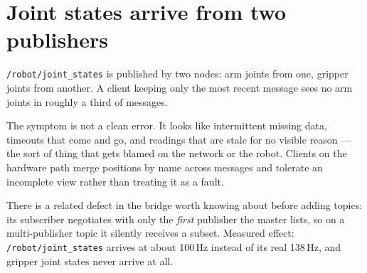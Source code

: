 \section{Joint states arrive from two publishers}
\label{sec:jointstate-merge}

\texttt{/robot/joint\_states} is published by two nodes: arm joints from one,
gripper joints from another. A client keeping only the most recent message sees
no arm joints in roughly a third of messages.

The symptom is not a clean error. It looks like intermittent missing data,
timeouts that come and go, and readings that are stale for no visible reason ---
the sort of thing that gets blamed on the network or the robot. Clients on the
hardware path merge positions by name across messages and tolerate an incomplete
view rather than treating it as a fault.

There is a related defect in the bridge worth knowing about before adding topics:
its subscriber negotiates with only the \emph{first} publisher the master lists,
so on a multi-publisher topic it silently receives a subset. Measured effect:
\texttt{/robot/joint\_states} arrives at about 100\,Hz instead of its real
138\,Hz, and gripper joint states never arrive at all.
